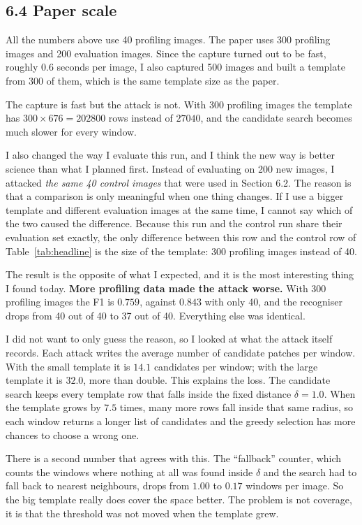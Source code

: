 \documentclass[11pt,a4paper]{article}
\begin{document}
\subsection*{6.4 Paper scale}

All the numbers above use 40 profiling images. The paper uses 300 profiling images and
200 evaluation images. Since the capture turned out to be fast, roughly 0.6 seconds per
image, I also captured 500 images and built a template from 300 of them, which is the
same template size as the paper.

The capture is fast but the attack is not. With 300 profiling images the template has
$300 \times 676 = 202800$ rows instead of $27040$, and the candidate search becomes much
slower for every window.

I also changed the way I evaluate this run, and I think the new way is better science
than what I planned first. Instead of evaluating on 200 new images, I attacked
\emph{the same 40 control images} that were used in Section 6.2. The reason is that a
comparison is only meaningful when one thing changes. If I use a bigger template and
different evaluation images at the same time, I cannot say which of the two caused the
difference. Because this run and the control run share their evaluation set exactly, the
only difference between this row and the control row of Table~\ref{tab:headline} is the
size of the template: 300 profiling images instead of 40.

The result is the opposite of what I expected, and it is the most interesting thing I
found today. \textbf{More profiling data made the attack worse.} With 300 profiling
images the F1 is $0.759$, against $0.843$ with only 40, and the recogniser drops from
40 out of 40 to 37 out of 40. Everything else was identical.

I did not want to only guess the reason, so I looked at what the attack itself records.
Each attack writes the average number of candidate patches per window. With the small
template it is $14.1$ candidates per window; with the large template it is $32.0$, more
than double. This explains the loss. The candidate search keeps every template row that
falls inside the fixed distance $\delta = 1.0$. When the template grows by $7.5$ times,
many more rows fall inside that same radius, so each window returns a longer list of
candidates and the greedy selection has more chances to choose a wrong one.

There is a second number that agrees with this. The ``fallback'' counter, which counts
the windows where nothing at all was found inside $\delta$ and the search had to fall
back to nearest neighbours, drops from $1.00$ to $0.17$ windows per image. So the big
template really does cover the space better. The problem is not coverage, it is that the
threshold was not moved when the template grew.
\end{document}
